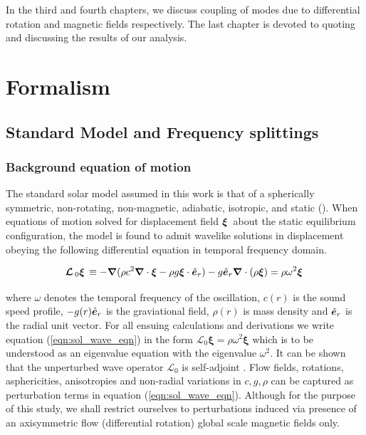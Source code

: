 In the third and fourth chapters, we discuss coupling of modes due to differential rotation and magnetic fields respectively. The last chapter is devoted to quoting and discussing the results of our analysis.
\chapter{Formalism}

\section{Standard Model and Frequency splittings} %
\subsection{Background equation of motion}
The standard solar model assumed in this work is that of a spherically symmetric, non-rotating, non-magnetic, adiabatic, isotropic, and static (\snr). When equations of motion solved for displacement field $\bm{\xi}\,$ about the static equilibrium configuration, the \snr model is found to admit wavelike solutions in displacement obeying the following differential equation in temporal frequency domain.

\begin{equation} \label{eqn:sol_wave_eqn}
\bm{\mathcal{L}}\,_0 \bm{\xi}\,  \equiv - \bm{\nabla} (\rho c^2 \boldsymbol{\nabla} \cdot \boldsymbol{\xi} - \rho g \boldsymbol{\xi} \cdot \hat{\bm{e}}_{r}) - g \hat{\bm{e}}_{r} \boldsymbol{\nabla} \cdot (\rho \boldsymbol{\xi}) = \rho \omega^2 \bm{\xi}\,
\end{equation}


where $\omega$ denotes the temporal frequency of the oscillation, $c(r)$ is the sound speed profile, $-g(r)\hat{\bm{e}}_{r}$ is the graviational field, $\rho(r)$ is mass density and $\hat{\bm{e}}_{r}$ is the radial unit vector. For all ensuing calculations and derivations we write equation (\ref{eqn:sol_wave_eqn}) in the form $\mathcal{L}_0 \boldsymbol{\xi} = \rho \omega^2 \boldsymbol{\xi}$ which is to be understood as an eigenvalue equation with the eigenvalue $\omega^2$. It can be shown that the unperturbed wave operator $\mathcal{L}_0$ is self-adjoint \cite{goedbloed2004}. Flow fields, rotations, asphericities, anisotropies and non-radial variations in $c, g, \rho$ can be captured as perturbation terms in equation (\ref{eqn:sol_wave_eqn}). Although for the purpose of this study, we shall restrict ourselves to perturbations induced via presence of an axisymmetric flow (differential rotation) global scale magnetic fields only.

